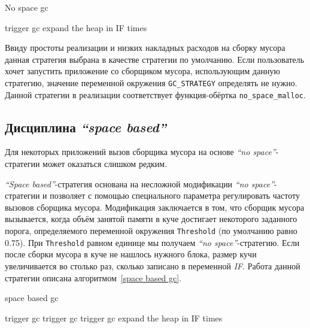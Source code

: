 \begin{algorithm}[hbt]
\caption{No space gc}
\label{algo-no-space}
\begin{algorithmic}[3]
        \State trigger gc
            \State expand the heap in IF times
        \EndIf
\EndIf
\end{algorithmic}
\end{algorithm}

Ввиду простоты реализации и низких накладных расходов на сборку мусора
данная стратегия выбрана в качестве стратегии по умолчанию.
Если пользователь хочет запустить приложение со сборщиком мусора,
использующим данную стратегию, значение переменной окружения \texttt{GC\_STRATEGY}
определять не нужно. Данной стратегии в реализации соответствует 
функция-обёртка \texttt{no\_space\_malloc}.



\subsection{Дисциплина \emph{``space based''}}
Для некоторых приложений вызов сборщика мусора на основе \emph{``no space''}-стратегии
может оказаться слишком редким. 

\emph{``Space based''}-стратегия основана на несложной модификации 
\emph{``no space''}-стратегии и позволяет с помощью специального параметра 
регулировать частоту вызовов сборщика мусора.
Модификация заключается в том, что сборщик мусора вызывается, когда
объём занятой памяти в куче достигает некоторого 
заданного порога, определяемого переменной окружения  \texttt{Threshold} (по умолчанию
равно 0.75). При \texttt{Threshold} равном единице мы получаем \emph{``no space''}-стратегию.
Если после сборки мусора в куче не нашлось нужного блока, размер кучи
увеличивается во столько раз, сколько записано в переменной \emph{IF}.
Работа данной стратегии описана алгоритмом~\ref{space based gc}.

\begin{algorithm}[hbt]
\caption{space based gc}
\label{space based gc}
\begin{algorithmic}[4]

    \State trigger gc
\EndIf
{}
        \State trigger gc
\EndIf
{}
            \State trigger gc
\EndIf
{}
    \State expand the heap in IF times
\EndIf 
\end{algorithmic}
\end{algorithm}


